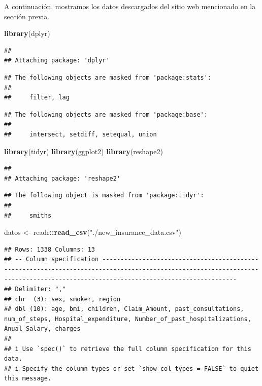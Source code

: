 \documentclass[
]{article}
\newenvironment{Shaded}{\begin{snugshade}}{\end{snugshade}}
\newcommand{\FunctionTok}[1]{\textcolor[rgb]{0.13,0.29,0.53}{\textbf{#1}}}
\newcommand{\NormalTok}[1]{#1}
\newcommand{\OtherTok}[1]{\textcolor[rgb]{0.56,0.35,0.01}{#1}}
\newcommand{\SpecialCharTok}[1]{\textcolor[rgb]{0.81,0.36,0.00}{\textbf{#1}}}
\newcommand{\StringTok}[1]{\textcolor[rgb]{0.31,0.60,0.02}{#1}}
\begin{document}
A continuación, mostramos los datos descargados del sitio web mencionado
en la sección previa.

\begin{Shaded}
\begin{Highlighting}[]
\FunctionTok{library}\NormalTok{(dplyr)}
\end{Highlighting}
\end{Shaded}

\begin{verbatim}
## 
## Attaching package: 'dplyr'
\end{verbatim}

\begin{verbatim}
## The following objects are masked from 'package:stats':
## 
##     filter, lag
\end{verbatim}

\begin{verbatim}
## The following objects are masked from 'package:base':
## 
##     intersect, setdiff, setequal, union
\end{verbatim}

\begin{Shaded}
\begin{Highlighting}[]
\FunctionTok{library}\NormalTok{(tidyr)}
\FunctionTok{library}\NormalTok{(ggplot2)}
\FunctionTok{library}\NormalTok{(reshape2)}
\end{Highlighting}
\end{Shaded}

\begin{verbatim}
## 
## Attaching package: 'reshape2'
\end{verbatim}

\begin{verbatim}
## The following object is masked from 'package:tidyr':
## 
##     smiths
\end{verbatim}

\begin{Shaded}
\begin{Highlighting}[]
\NormalTok{datos }\OtherTok{\textless{}{-}}\NormalTok{ readr}\SpecialCharTok{::}\FunctionTok{read\_csv}\NormalTok{(}\StringTok{"./new\_insurance\_data.csv"}\NormalTok{)}
\end{Highlighting}
\end{Shaded}

\begin{verbatim}
## Rows: 1338 Columns: 13
## -- Column specification ---------------------------------------------------------------------------------------------------------------------------------------------------------------------------------
## Delimiter: ","
## chr  (3): sex, smoker, region
## dbl (10): age, bmi, children, Claim_Amount, past_consultations, num_of_steps, Hospital_expenditure, Number_of_past_hospitalizations, Anual_Salary, charges
## 
## i Use `spec()` to retrieve the full column specification for this data.
## i Specify the column types or set `show_col_types = FALSE` to quiet this message.
\end{verbatim}
\end{document}
